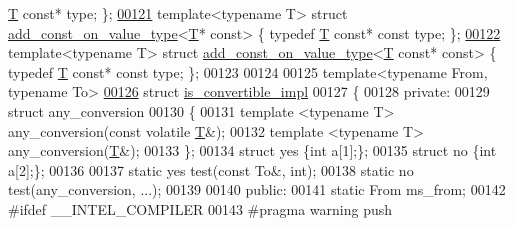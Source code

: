 \begin{DoxyCode}
      \hyperlink{group___sparse_core___module}{T} \textcolor{keyword}{const}* type; \};
\hyperlink{struct_eigen_1_1internal_1_1add__const__on__value__type_3_01_t_01_5const_01_4}{00121} \textcolor{keyword}{template}<\textcolor{keyword}{typename} T> \textcolor{keyword}{struct }\hyperlink{struct_eigen_1_1internal_1_1add__const__on__value__type}{add\_const\_on\_value\_type}<\hyperlink{group___sparse_core___module}{T}* \textcolor{keyword}{const}>  \{ \textcolor{keyword}{typedef} 
      \hyperlink{group___sparse_core___module}{T} \textcolor{keyword}{const}* \textcolor{keyword}{const} type; \};
\hyperlink{struct_eigen_1_1internal_1_1add__const__on__value__type_3_01_t_01const_01_5const_01_4}{00122} \textcolor{keyword}{template}<\textcolor{keyword}{typename} T> \textcolor{keyword}{struct }\hyperlink{struct_eigen_1_1internal_1_1add__const__on__value__type}{add\_const\_on\_value\_type}<\hyperlink{group___sparse_core___module}{T} const* \textcolor{keyword}{const}>  \{ \textcolor{keyword}{typedef} 
      \hyperlink{group___sparse_core___module}{T} \textcolor{keyword}{const}* \textcolor{keyword}{const} type; \};
00123 
00124 
00125 \textcolor{keyword}{template}<\textcolor{keyword}{typename} From, \textcolor{keyword}{typename} To>
\hyperlink{struct_eigen_1_1internal_1_1is__convertible__impl}{00126} \textcolor{keyword}{struct }\hyperlink{struct_eigen_1_1internal_1_1is__convertible__impl}{is\_convertible\_impl}
00127 \{
00128 \textcolor{keyword}{private}:
00129   \textcolor{keyword}{struct }any\_conversion
00130   \{
00131     \textcolor{keyword}{template} <\textcolor{keyword}{typename} T> any\_conversion(\textcolor{keyword}{const} \textcolor{keyword}{volatile} \hyperlink{group___sparse_core___module}{T}&);
00132     \textcolor{keyword}{template} <\textcolor{keyword}{typename} T> any\_conversion(\hyperlink{group___sparse_core___module}{T}&);
00133   \};
00134   \textcolor{keyword}{struct }yes \{\textcolor{keywordtype}{int} a[1];\};
00135   \textcolor{keyword}{struct }no  \{\textcolor{keywordtype}{int} a[2];\};
00136 
00137   \textcolor{keyword}{static} yes test(\textcolor{keyword}{const} To&, \textcolor{keywordtype}{int});
00138   \textcolor{keyword}{static} no  test(any\_conversion, ...);
00139 
00140 \textcolor{keyword}{public}:
00141   \textcolor{keyword}{static} From ms\_from;
00142 \textcolor{preprocessor}{#ifdef \_\_INTEL\_COMPILER}
00143 \textcolor{preprocessor}{  #pragma warning push}

\end{DoxyCode}

